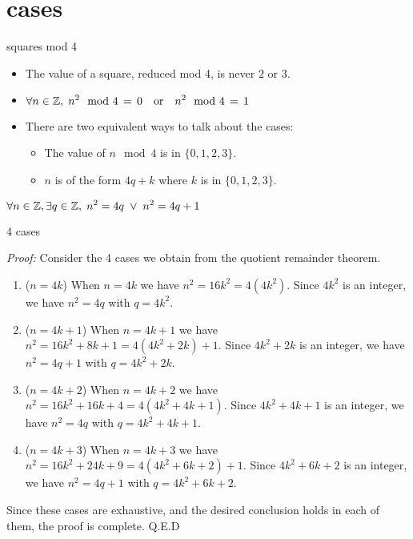 \documentclass[landscape]{beamer}
\begin{document}
\section{cases}

\begin{frame}{squares mod 4}
\begin{itemize}
\item The value of a square, reduced mod 4, is never $2$ or $3$. \pause
\item $\displaystyle \forall n \in {\mathbb Z}, \; n^2 \mod 4 \, = \, 0 \quad \mbox{or} \quad n^2 \mod 4 \, = \, 1$ \pause
\item There are two equivalent ways to talk about the cases: \pause
\begin{itemize} 
\item The value of $n \mod 4$ is in $\{0,1,2,3\}$. \pause
\item $n$ is of the form $4q+k$ where $k$ is in $\{0,1,2,3\}$.\pause
\end{itemize}
\end{itemize}
\begin{thm*}
$\displaystyle \forall n \in {\mathbb Z}, \exists q \in {\mathbb Z}, \; n^2 = 4q \; \lor \; n^2 = 4q+1$
\end{thm*}

\end{frame}

\begin{frame}{4 cases}

{\em Proof:} Consider the 4 cases we obtain from the quotient remainder theorem. \pause
\begin{enumerate}
\item ($n=4k$) When $n=4k$ we have $n^2 = 16k^2 = 4(4k^2)$. Since $4k^2$ is an integer, we have $n^2=4q$ with $q = 4k^2$. \pause
\item ($n=4k+1$) When $n=4k+1$ we have $n^2 = 16k^2 + 8k + 1 = 4(4k^2+2k) +1 $.  Since $4k^2+2k$ is an integer, we have $n^2=4q+1$ with $q = 4k^2+2k$. \pause
\item ($n=4k+2$) When $n=4k+2$ we have $n^2 = 16k^2 + 16k + 4 = 4(4k^2+4k+1) $.  Since $4k^2+4k+1$ is an integer, we have $n^2=4q$ with $q = 4k^2+4k+1$. \pause
\item ($n=4k+3$) When $n=4k+3$ we have $n^2 = 16k^2 + 24k + 9 = 4(4k^2+6k+2)+1 $.  Since $4k^2+6k+2$ is an integer, we have $n^2=4q+1$ with $q = 4k^2+6k+2$. \pause
\end{enumerate}
Since these cases are exhaustive, and the desired conclusion holds in each of them, the proof is complete.
\hfill Q.E.D

\end{frame}
\end{document}
